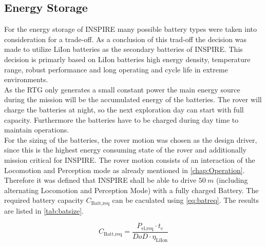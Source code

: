 \subsection{Energy Storage} 
For the energy storage of INSPIRE many possible battery types were taken into consideration for a trade-off. As a conclusion of this trad-off the decision was made to utilize LiIon batteries as the secondary batteries of INSPIRE. This decision is primarly based on LiIon batteries high energy density, temperature range, robust performance and long operating and cycle life in extreme environments. \\
As the RTG only generates a small constant power the main energy source during the mission will be the accumulated energy of the batteries. The rover will charge the batteries at night, so the next exploration day can start with full capacity. Furthermore the batteries have to be charged during day time to maintain operations.\\
For the sizing of the batteries, the rover motion was chosen as the design driver, since this is the highest energy consuming state of the rover and additionally mission critical for INSPIRE. The rover motion consists of an interaction of the Locomotion and Perception mode as already mentioned in \autoref{chap:Operation}. Therefore it was defined that INSPIRE shall be able to drive $ 50 \ m $ (including alternating Locomotion and Perception Mode) with a fully charged Battery. The required battery capacity $C_\text{Batt,req}$ can be caculated using \autoref{eq:batreq}. The results are listed in \autoref{tab:batsize}.


\begin{equation}
C_\text{Batt,req} = \frac{P_\text{el,req} \cdot t_e }{DoD \cdot \eta_\text{LiIon}}
\label{eq:batreq}
\end{equation}

